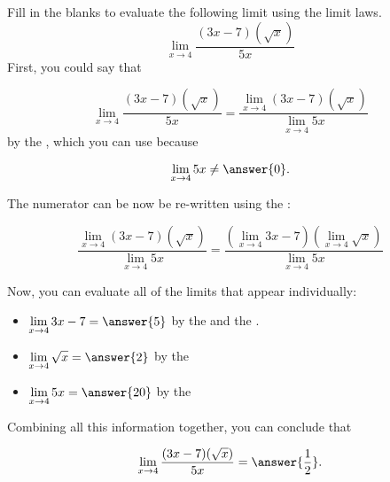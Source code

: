 \documentclass[handout]{ximera}
\begin{document}
\begin{exercise}

Fill in the blanks to evaluate the following limit using the limit laws. 
  \[
  \displaystyle\lim_{x\to 4} \frac{(3x-7)(\sqrt{x})}{5x}  \]
First, you could say that 

\[
  \displaystyle\lim_{x\to 4} \frac{(3x-7)(\sqrt{x})}{5x} = \frac{\displaystyle\lim_{x\to 4} (3x-7)(\sqrt{x})}{\displaystyle\lim_{x\to 4} 5x} \]
by the , which you can use because 

\[
  \displaystyle\lim_{x\to 4} 5x \neq \answer{0}. \]
  
The numerator can be now be re-written using the : 

\[ \frac{\displaystyle\lim_{x\to 4} (3x-7)(\sqrt{x})}{\displaystyle\lim_{x\to 4} 5x} = \frac{\left(\displaystyle\lim_{x\to 4} 3x-7 \right) \left(\displaystyle\lim_{x\to 4}\sqrt{x}\right)}{\displaystyle\lim_{x\to 4} 5x} \]

Now, you can evaluate all of the limits that appear individually: 

\begin{itemize}

\item $\displaystyle\lim_{x\to 4} 3x-7 = \answer{5}$ by the  and the .

\item $\displaystyle\lim_{x\to 4} \sqrt{x} = \answer{2}$ by the 

\item $\displaystyle\lim_{x \to 4} 5x = \answer{20}$ by the 

\end{itemize}

Combining all this information together, you can conclude that 

\[
  \displaystyle\lim_{x\to 4} \frac{(3x-7)(\sqrt{x})}{5x} = \answer{\frac{1}{2}}.  \]

\end{exercise}
\end{document}
